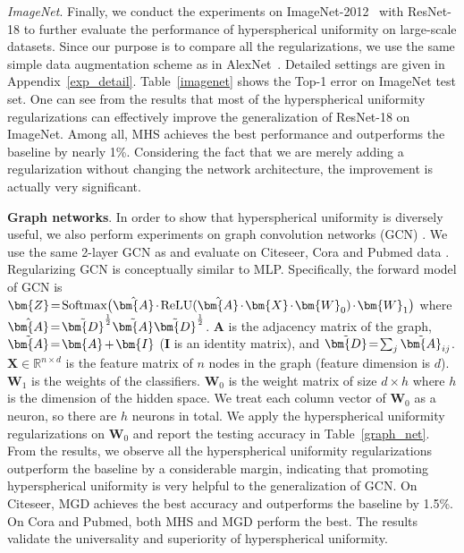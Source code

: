 \emph{ImageNet}. Finally, we conduct the experiments on ImageNet-2012~\cite{russakovsky2014imagenet} with ResNet-18 to further evaluate the performance of hyperspherical uniformity on large-scale datasets. Since our purpose is to compare all the regularizations, we use the same simple data augmentation scheme as in AlexNet~\cite{krizhevsky2012imagenet}. Detailed settings are given in Appendix~\ref{exp_detail}. Table~\ref{imagenet} shows the Top-1 error on ImageNet test set. One can see from the results that most of the hyperspherical uniformity regularizations can effectively improve the generalization of ResNet-18 on ImageNet. Among all, MHS achieves the best performance and outperforms the baseline by nearly 1\%. Considering the fact that we are merely adding a regularization without changing the network architecture, the improvement is actually very significant.

\textbf{Graph networks}. In order to show that hyperspherical uniformity is diversely useful, we also perform experiments on graph convolution networks (GCN) \cite{kipf2016semi}. We use the same 2-layer GCN as \cite{kipf2016semi} and evaluate on Citeseer, Cora and Pubmed data \cite{sen2008collective}.  Regularizing GCN is conceptually similar to MLP. Specifically, the forward model of GCN is $\thickmuskip=2mu \medmuskip=2mu\bm{Z}=\textnormal{Softmax}\big(\hat{\bm{A}}\cdot\textnormal{ReLU}(\hat{\bm{A}}\cdot\bm{X}\cdot\bm{W}_0)\cdot\bm{W}_1\big)$ where $\thickmuskip=2mu \medmuskip=2mu \hat{\bm{A}}=\tilde{\bm{D}}^{\frac{1}{2}}\tilde{\bm{A}}\tilde{\bm{D}}^{\frac{1}{2}}$. $\bm{A}$ is the adjacency matrix of the graph,  $\thickmuskip=2mu \medmuskip=2mu \tilde{\bm{A}}=\bm{A}+\bm{I}$ ($\bm{I}$ is an identity matrix), and $\thickmuskip=2mu \medmuskip=2mu \tilde{\bm{D}}=\sum_j\tilde{\bm{A}}_{ij}$. $\bm{X}\in\mathbb{R}^{n\times d}$ is the feature matrix of $n$ nodes in the graph (feature dimension is $d$). $\bm{W}_1$ is the weights of the classifiers. $\bm{W}_0$ is the weight matrix of size $d\times h$ where $h$ is the dimension of the hidden space. We treat each column vector of $\bm{W}_0$ as a neuron, so there are $h$ neurons in total. We apply the hyperspherical uniformity regularizations on $\bm{W}_0$ and report the testing accuracy in Table~\ref{graph_net}. From the results, we observe all the hyperspherical uniformity regularizations outperform the baseline by a considerable margin, indicating that promoting hyperspherical uniformity is very helpful to the generalization of GCN. On Citeseer, MGD achieves the best accuracy and outperforms the baseline by 1.5\%. On Cora and Pubmed, both MHS and MGD perform the best. The results validate the universality and superiority of hyperspherical uniformity.

